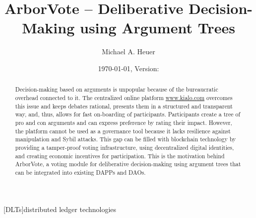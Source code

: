 \documentclass[%
aip,
amsmath,amssymb,
reprint,%
unsortedaddress,
nofootinbib
]{revtex4-2}
\begin{document}
\title{ArborVote -- Deliberative Decision-Making using Argument Trees }
\author{Michael A. Heuer}
\date{\today, Version: \gitDescribe}

\begin{abstract}
Decision-making based on arguments is unpopular because of the bureaucratic overhead connected to it. 
The centralized online platform \href{https://www.kialo.com/}{www.kialo.com} overcomes this issue and 
	keeps debates rational, 
	presents them in a structured and transparent way, and, thus,
	allows for fast on-boarding of participants.
Participants create a tree of pro and con arguments and can express preference by rating their impact. 
However, the platform cannot be used as a governance tool because it lacks resilience against manipulation and Sybil attacks.
This gap can be filled with blockchain technology by
	providing a tamper-proof voting infrastructure,
	using decentralized digital identities, and
	creating economic incentives for participation.
This is the motivation behind ArborVote, a voting module for deliberative decision-making using argument trees that can be integrated into existing \aclp{DAPP} and \aclp{DAO}.
\end{abstract}


\maketitle

\setlength{\parindent}{0cm}
\setlength{\parskip}{0.4em plus0.1em minus0.1em}

\begin{acronym}
	[DLTs]{distributed ledger technologies}
\end{acronym}



\end{document}
